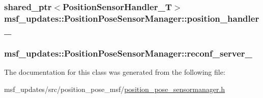 \hypertarget{classmsf__updates_1_1PositionPoseSensorManager_ad3d379ea40323daaefb8ac4e8d96de1a}{
\subsubsection[{position\-\_\-handler\-\_\-}]{\setlength{\rightskip}{0pt plus 5cm}shared\-\_\-ptr$<${\bf Position\-Sensor\-Handler\-\_\-\-T}$>$ msf\-\_\-updates\-::\-Position\-Pose\-Sensor\-Manager\-::position\-\_\-handler\-\_\-\hspace{0.3cm}{\ttfamily [private]}}}\label{classmsf__updates_1_1PositionPoseSensorManager_ad3d379ea40323daaefb8ac4e8d96de1a}
\hypertarget{classmsf__updates_1_1PositionPoseSensorManager_a002812d20bc9ba60cd681b702b87a5c6}{
\subsubsection[{reconf\-\_\-server\-\_\-}]{ msf\-\_\-updates\-::\-Position\-Pose\-Sensor\-Manager\-::reconf\-\_\-server\-\_\-\hspace{0.3cm}{\ttfamily [private]}}}\label{classmsf__updates_1_1PositionPoseSensorManager_a002812d20bc9ba60cd681b702b87a5c6}


The documentation for this class was generated from the following file\-:\begin{DoxyCompactItemize}
\item 
msf\-\_\-updates/src/position\-\_\-pose\-\_\-msf/\hyperlink{position__pose__sensormanager_8h}{position\-\_\-pose\-\_\-sensormanager.\-h}\end{DoxyCompactItemize}
